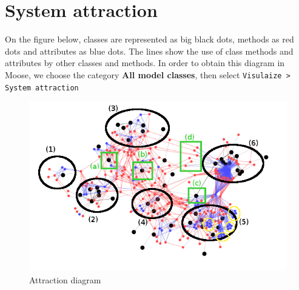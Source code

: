 \section{System attraction}
On the figure below, classes are represented as big black dots, methods as red dots and attributes as blue dots. The lines show the use of class methods and attributes by other classes and methods. In order to obtain this diagram in Moose, we choose the category \textbf{All model classes}, then select \texttt{Visulaize > System attraction}

\begin{figure}[H]
    \includegraphics[width=\textwidth]{Attraction_annotated.png}
    \caption{\label{fig:attraction} Attraction diagram}
\end{figure}

